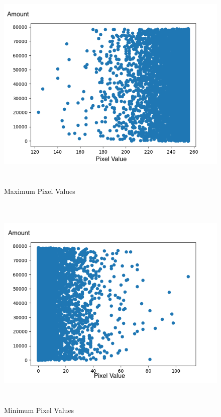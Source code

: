 \begin{figure}
	\includegraphics[width=\textwidth, height=10.5cm]{images/maxVals}
	\caption{Maximum Pixel Values}
	\label{maxVals}
\end{figure}

\begin{figure}
	\includegraphics[width=\textwidth, height=10.5cm]{images/minVals}
	\caption{Minimum Pixel Values}
	\label{minVals}
\end{figure}

